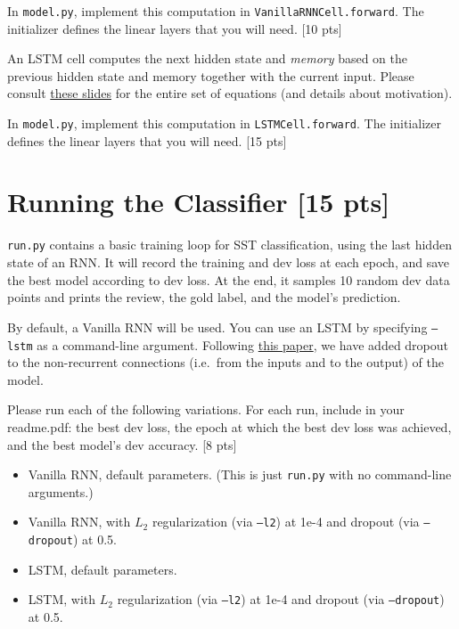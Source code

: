 \documentclass[11pt]{article}
\begin{document}
\noindent In \texttt{model.py}, implement this computation in \texttt{VanillaRNNCell.forward}.  The initializer defines the linear layers that you will need. \hfill [10 pts]


\vspace{2em}
 An LSTM cell computes the next hidden state and \emph{memory} based on the previous hidden state and memory together with the current input.  Please consult \href{https://cmdowney88.github.io/teaching/uw_574/slides/9_lstm.pdf}{these slides} for the entire set of equations (and details about motivation).

\noindent In \texttt{model.py}, implement this computation in \texttt{LSTMCell.forward}.  The initializer defines the linear layers that you will need. \hfill [15 pts]



\section{Running the Classifier [15 pts]}

\texttt{run.py} contains a basic training loop for SST classification, using the last hidden state of an RNN. It will record the training and dev loss at each epoch, and save the best model according to dev loss.  At the end, it samples 10 random dev data points and prints the review, the gold label, and the model's prediction.

\vspace{2em}
 By default, a Vanilla RNN will be used.  You can use an LSTM by specifying \texttt{--lstm} as a command-line argument.  Following \href{https://arxiv.org/abs/1409.2329}{this paper}, we have added dropout to the non-recurrent connections (i.e.\ from the inputs and to the output) of the model.

\noindent Please run each of the following variations.  For each run, include in your readme.pdf: the best dev loss, the epoch at which the best dev loss was achieved, and the best model's dev accuracy. \hfill [8 pts]
\begin{itemize}
  \item Vanilla RNN, default parameters.  (This is just \texttt{run.py} with no command-line arguments.)
  \item Vanilla RNN, with $L_2$ regularization (via \texttt{--l2}) at 1e-4 and dropout (via \texttt{--dropout}) at 0.5.
  \item LSTM, default parameters. 
  \item LSTM, with $L_2$ regularization (via \texttt{--l2}) at 1e-4 and dropout (via \texttt{--dropout}) at 0.5.
\end{itemize}
\end{document}
